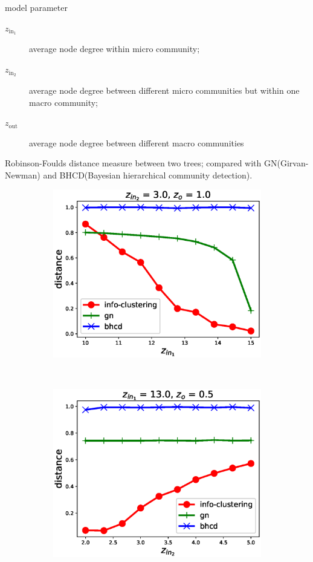 \documentclass[notheorems]{beamer}
\begin{document}
\begin{frame}
	\begin{block}{model parameter}
	\begin{description}
	  \item[$z_{\mathrm{in}_1}$] average node degree within micro community;
	  \item[$z_{\mathrm{in}_2}$] average node degree between different micro communities but within one macro community;  
	  \item[$z_{\mathrm{out}}$] average node degree between different macro communities
    \end{description}
    Robinson-Foulds distance measure between two trees;    
    {\footnotesize compared with GN(Girvan-Newman) and BHCD(Bayesian hierarchical community detection).
	}
    \end{block}
\begin{figure}
	\centering
	\begin{subfigure}{0.33\textwidth}
		\includegraphics[width=\textwidth]{pic/z_in_1.eps}
		\caption{}
	\end{subfigure}~
	\begin{subfigure}{0.33\textwidth}
		\includegraphics[width=\textwidth]{pic/z_in_2.eps}

\end{subfigure}
\end{figure}
\end{frame}
\end{document}
